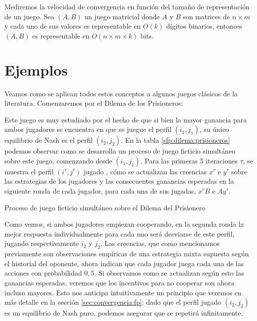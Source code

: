 Mediremos la velocidad de convergencia en función del tamaño de representación de un juego. Sea $(A, B)$ un juego matricial donde $A$ y $B$ son matrices de $n \times m$ y cada uno de sus valores es representable en $O(k)$ dígitos binarios, entonces $(A, B)$ es representable en $O(n \times m \times k)$ bits.


\section{Ejemplos}

Veamos como se aplican todos estos conceptos a algunos juegos clásicos de la literatura. Comenzaremos por el Dilema de los Prisioneros:




Este juego es muy estudiado por el hecho de que si bien la mayor ganancia para ambos jugadores se encuentra en que se juegue el perfil $(i_1, j_1)$, su único equilibrio de Nash es el perfil $(i_2, j_2)$. En la tabla \ref{sfp:dilema:prisioneros} podemos observar como se desarrolla un proceso de juego ficticio simultáneo sobre este juego, comenzando desde $(i_1, j_1)$. Para las primeras 5 iteraciones $\tau$, se muestra el perfil $(i^\tau, j^\tau)$ jugado , cómo se actualizan las creencias $x^\tau$ e $y^\tau$ sobre las estrategias de los jugadores y las consecuentes ganancias esperadas en la siguiente ronda de cada jugador, para cada una de sus jugadas, $x^\tau B$ e $A y^\tau$.

\begin{table} %
    \centering
    
    \caption{Proceso de juego ficticio simultáneo sobre el Dilema del Prisionero}
    \label{sfp:dilema:prisioneros}
\end{table}

Como vemos, si ambos jugadores empiezan cooperando, en la segunda ronda la mejor respuesta individualmente para cada uno será desviarse de este perfil, jugando respectivamente $i_2$ y $j_2$. Las creencias, que como mencionamos previamente son observaciones empíricas de una estrategia mixta supuesta según el historial del oponente, ahora indican que cada jugador juega cada una de las acciones con probabilidad $0,5$. Si observamos como se actualizan según esto las ganancias esperadas, veremos que los incentivos para no cooperar son ahora incluso mayores. Esto nos anticipa intuitivamente un principio que veremos en más detalle en la sección \ref{sec:convergencia:fp}: dado que el perfil jugado $(i_2, j_2)$ es un equilibrio de Nash puro, podemos asegurar que se repetirá infinitamente.

